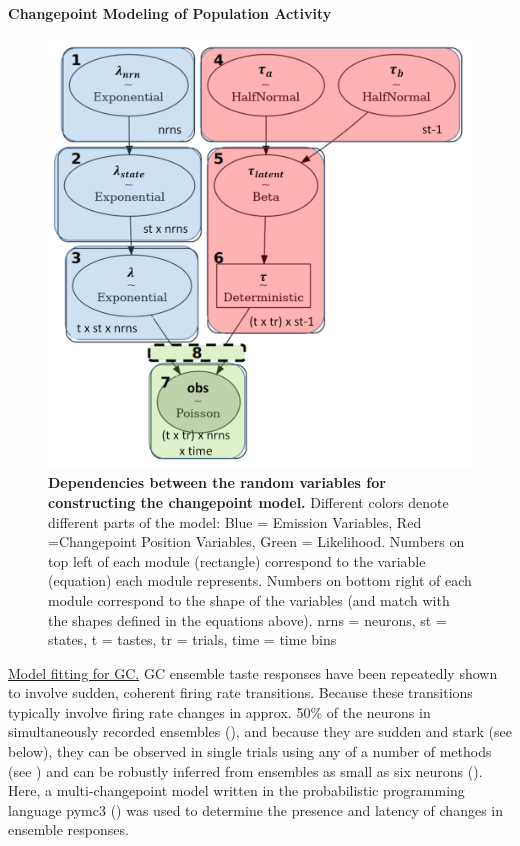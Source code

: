 \begin{refsection}
\noindent\textbf{Changepoint Modeling of Population Activity}\par
\smallskip

\begin{figure}
\includegraphics[width=\linewidth]{mahmood_22_figures/fig1-0.png}
\caption{\textbf{Dependencies between the random variables for constructing the changepoint model.} Different colors denote different parts of the model: Blue = Emission Variables, Red =Changepoint Position Variables, Green = Likelihood. Numbers on top left of each module (rectangle) correspond to the variable (equation) each module represents. Numbers on bottom right of each module correspond to the shape of the variables (and match with the shapes defined in the equations above). nrns = neurons, st = states, t = tastes, tr = trials, time = time bins}
\label{fig:wrapfig}
\end{figure}

\noindent\underline{Model fitting for GC.} GC ensemble taste responses have been repeatedly shown to involve sudden, coherent firing rate transitions. Because these transitions typically involve firing rate changes in approx. 50\% of the neurons in simultaneously recorded ensembles (\cite{jones2007a}), and because they are sudden and stark (see below), they can be observed in single trials using any of a number of methods (see \cite{mukherjee2019a}) and can be robustly inferred from ensembles as small as six neurons (\cite{jones2007a}). Here, a multi-changepoint model written in the probabilistic programming language pymc3 (\cite{salvatier2016a}) was used to determine the presence and latency of changes in ensemble responses.


\end{refsection}
